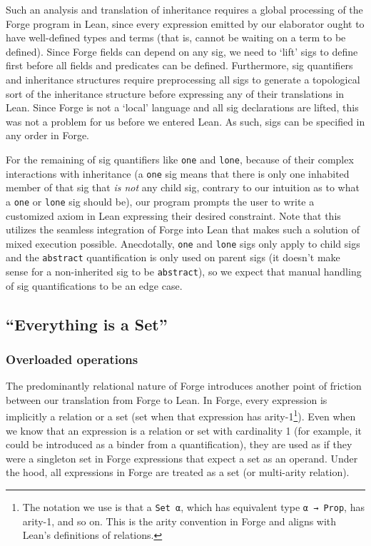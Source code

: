 
Such an analysis and translation of inheritance requires a global processing of the Forge program in Lean, since every expression emitted by our elaborator ought to have well-defined types and terms (that is, cannot be waiting on a term to be defined). Since Forge fields can depend on any sig, we need to `lift' sigs to define first before all fields and predicates can be defined. Furthermore, sig quantifiers and inheritance structures require preprocessing all sigs to generate a topological sort of the inheritance structure before expressing any of their translations in Lean. Since Forge is not a `local' language and all sig declarations are lifted, this was not a problem for us before we entered Lean. As such, sigs can be specified in any order in Forge. 

For the remaining of sig quantifiers like \texttt{one} and \texttt{lone}, because of their complex interactions with inheritance (a \texttt{one} sig means that there is only one inhabited member of that sig that \emph{is not} any child sig, contrary to our intuition as to what a \texttt{one} or \texttt{lone} sig should be), our program prompts the user to write a customized axiom in Lean expressing their desired constraint. Note that this utilizes the seamless integration of Forge into Lean that makes such a solution of mixed execution possible. Anecdotally, \texttt{one} and \texttt{lone} sigs only apply to child sigs and the \texttt{abstract} quantification is only used on parent sigs (it doesn't make sense for a non-inherited sig to be \texttt{abstract}), so we expect that manual handling of sig quantifications to be an edge case. 


\subsection{``Everything is a Set''}\label{sec:everything-is-a-set}
\subsubsection{Overloaded operations}
The predominantly relational nature of Forge introduces another point of friction between our translation from Forge to Lean. In Forge, every expression is implicitly a relation or a set (set when that expression has arity-1\footnote{The notation we use is that a \texttt{Set α}, which has equivalent type \texttt{α → Prop}, has arity-1, and so on. This is the arity convention in Forge and aligns with Lean's definitions of relations.}). Even when we know that an expression is a relation or set with cardinality 1 (for example, it could be introduced as a binder from a quantification), they are used as if they were a singleton set in Forge expressions that expect a set as an operand. Under the hood, all expressions in Forge are treated as a set (or multi-arity relation). 

